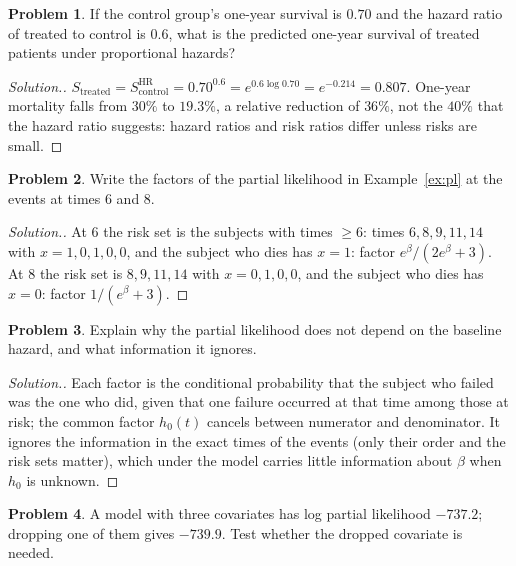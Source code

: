 \documentclass[11pt,a4paper]{article}
\numberwithin{equation}{section}
\theoremstyle{definition}
\newtheorem{problemx}{Problem}[subsection]
\newenvironment{problem}{\begin{problemx}}{\end{problemx}}
\newenvironment{solution}
  {\renewcommand{\qedsymbol}{}\begin{proof}[\textit{Solution}.]}
  {\end{proof}}
\begin{document}
\begin{problem}
If the control group's one-year survival is $0.70$ and the hazard ratio of treated to control is $0.6$, what is the predicted one-year survival of treated patients under proportional hazards?
\end{problem}

\begin{solution}
$S_{\text{treated}} = S_{\text{control}}^{\text{HR}} = 0.70^{0.6} = e^{0.6\log 0.70} = e^{-0.214} = 0.807$. One-year mortality falls from $30\%$ to $19.3\%$, a relative reduction of $36\%$, not the $40\%$ that the hazard ratio suggests: hazard ratios and risk ratios differ unless risks are small.
\end{solution}

\begin{problem}
Write the factors of the partial likelihood in Example~\ref{ex:pl} at the events at times $6$ and $8$.
\end{problem}

\begin{solution}
At $6$ the risk set is the subjects with times $\geq 6$: times $6, 8, 9, 11, 14$ with $x = 1, 0, 1, 0, 0$, and the subject who dies has $x = 1$: factor $e^\beta/(2e^\beta + 3)$. At $8$ the risk set is $8, 9, 11, 14$ with $x = 0, 1, 0, 0$, and the subject who dies has $x = 0$: factor $1/(e^\beta + 3)$.
\end{solution}

\begin{problem}
Explain why the partial likelihood does not depend on the baseline hazard, and what information it ignores.
\end{problem}

\begin{solution}
Each factor is the conditional probability that the subject who failed was the one who did, given that one failure occurred at that time among those at risk; the common factor $h_0(t)$ cancels between numerator and denominator. It ignores the information in the exact times of the events (only their order and the risk sets matter), which under the model carries little
information about $\beta$ when $h_0$ is unknown.
\end{solution}

\begin{problem}
A model with three covariates has log partial likelihood $-737.2$; dropping one of them gives $-739.9$. Test whether the dropped covariate is needed.
\end{problem}
\end{document}
